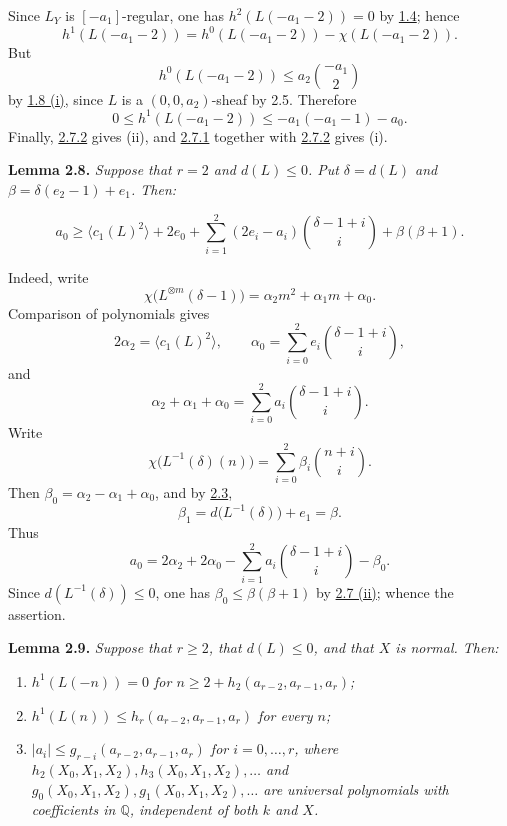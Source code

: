 Since \(L_Y\) is \([-a_1]\)-regular, one has
\(h^2(L(-a_1-2))=0\) by \hyperlink{sga6.e13.prop.1-4}{1.4}; hence
\[
h^1(L(-a_1-2))
=h^0(L(-a_1-2))-\chi(L(-a_1-2)).
\]
But
\[
h^0(L(-a_1-2))\le a_2\binom{-a_1}{2}
\]
by \hyperlink{sga6.e13.prop.1-8}{1.8 (i)}, since \(L\) is a \((0,0,a_2)\)-sheaf by 2.5. Therefore
\begin{equation}
0\le h^1(L(-a_1-2))\le -a_1(-a_1-1)-a_0.
\tag{2.7.2}
\end{equation}
Finally, \hyperlink{sga6.e13.eq.2-7-2}{2.7.2} gives (ii), and \hyperlink{sga6.e13.eq.2-7-1}{2.7.1} together with \hyperlink{sga6.e13.eq.2-7-2}{2.7.2} gives (i).

\textbf{Lemma 2.8.} \emph{Suppose that \(r=2\) and \(d(L)\le0\). Put
\(\delta=d(L)\) and \(\beta=\delta(e_2-1)+e_1\). Then:}

\[
a_0\ge
\bigl\langle c_1(L)^2\bigr\rangle+2e_0
+\sum_{i=1}^{2}(2e_i-a_i)\binom{\delta-1+i}{i}
+\beta(\beta+1).
\]

Indeed, write
\[
\chi\bigl(L^{\otimes m}(\delta-1)\bigr)
=\alpha_2m^2+\alpha_1m+\alpha_0.
\]
Comparison of polynomials gives
\[
2\alpha_2=\bigl\langle c_1(L)^2\bigr\rangle,
\qquad
\alpha_0=\sum_{i=0}^{2}e_i\binom{\delta-1+i}{i},
\]
and
\[
\alpha_2+\alpha_1+\alpha_0
=\sum_{i=0}^{2}a_i\binom{\delta-1+i}{i}.
\]
Write
\[
\chi\bigl(L^{-1}(\delta)(n)\bigr)
=\sum_{i=0}^{2}\beta_i\binom{n+i}{i}.
\]
Then \(\beta_0=\alpha_2-\alpha_1+\alpha_0\), and by \hyperlink{sga6.e13.lem.2-3}{2.3},
\[
\beta_1=d\bigl(L^{-1}(\delta)\bigr)+e_1=\beta.
\]
Thus
\[
a_0=2\alpha_2+2\alpha_0
-\sum_{i=1}^{2}a_i\binom{\delta-1+i}{i}-\beta_0.
\]
Since \(d(L^{-1}(\delta))\le0\), one has
\(\beta_0\le\beta(\beta+1)\) by \hyperlink{sga6.e13.lem.2-7}{2.7 (ii)}; whence the assertion.

\textbf{Lemma 2.9.} \emph{Suppose that \(r\ge2\), that \(d(L)\le0\),
and that \(X\) is normal. Then:}
\begin{enumerate}[label=(\roman*)]
\item \emph{\(h^1(L(-n))=0\) for
\(n\ge2+h_2(a_{r-2},a_{r-1},a_r)\);}
\item \emph{\(h^1(L(n))\le h_r(a_{r-2},a_{r-1},a_r)\) for every
\(n\);}
\item \emph{\(|a_i|\le g_{r-i}(a_{r-2},a_{r-1},a_r)\) for
\(i=0,\ldots,r\), where
\(h_2(X_0,X_1,X_2),h_3(X_0,X_1,X_2),\ldots\) and
\(g_0(X_0,X_1,X_2),g_1(X_0,X_1,X_2),\ldots\) are universal
polynomials with coefficients in \(\mathbb Q\), independent of both
\(k\) and \(X\).}
\end{enumerate}

